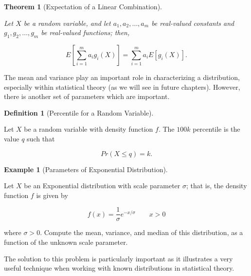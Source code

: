 \documentclass[
  letterpaper,
  DIV=11,
  numbers=noendperiod]{scrreprt}
\theoremstyle{definition}
\newtheorem{definition}{Definition}[chapter]
\theoremstyle{plain}
\newtheorem{theorem}{Theorem}[chapter]
\theoremstyle{definition}
\newtheorem{example}{Example}[chapter]
\theoremstyle{remark}
\begin{document}
\begin{theorem}[Expectation of a Linear
Combination]\protect\hypertarget{thm-expectation}{}\label{thm-expectation}

Let \(X\) be a random variable, and let \(a_1, a_2, \dotsc, a_m\) be
real-valued constants and \(g_1, g_2, \dotsc, g_m\) be real-valued
functions; then,

\[E\left[\sum_{i=1}^{m} a_i g_i(X)\right] = \sum_{i=1}^{m} a_i E\left[g_i(X)\right].\]

\end{theorem}

The mean and variance play an important role in characterizing a
distribution, especially within statistical theory (as we will see in
future chapters). However, there is another set of parameters which are
important.

\begin{definition}[Percentile for a Random
Variable]\protect\hypertarget{def-population-percentile}{}\label{def-population-percentile}

Let \(X\) be a random variable with density function \(f\). The \(100k\)
percentile is the value \(q\) such that

\[Pr(X \leq q) = k.\]

\end{definition}

\begin{example}[Parameters of Exponential
Distribution]\protect\hypertarget{exm-parameters}{}\label{exm-parameters}

Let \(X\) be an Exponential distribution with scale parameter
\(\sigma\); that is, the density function \(f\) is given by

\[f(x) = \frac{1}{\sigma} e^{-x/\sigma} \qquad x > 0\]

where \(\sigma > 0.\) Compute the mean, variance, and median of this
distribution, as a function of the unknown scale parameter.

\end{example}

The solution to this problem is particularly important as it illustrates
a very useful technique when working with known distributions in
statistical theory.
\end{document}
